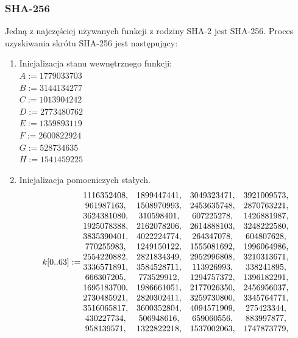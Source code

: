\subsubsection{SHA-256}
Jedną z najczęściej używanych funkcji z rodziny SHA-2 jest SHA-256. Proces uzyskiwania skrótu SHA-256 jest następujący:
\begin{enumerate}
	\item Inicjalizacja stanu wewnętrznego funkcji: \\
		$A := 1779033703$ \\
		$B := 3144134277$ \\
		$C := 1013904242$ \\
		$D := 2773480762$ \\
		$E := 1359893119$ \\
		$F := 2600822924$ \\
		$G := 528734635$ \\
		$H := 1541459225$
	\item Inicjalizacja pomocniczych stałych. \\
			$$
			k[0..63] := \\
			\begin{matrix}
				1116352408, & 1899447441, & 3049323471, & 3921009573, \\
				961987163,  & 1508970993, & 2453635748, & 2870763221, \\
				3624381080, & 310598401,  & 607225278,  & 1426881987, \\
				1925078388, & 2162078206, & 2614888103, & 3248222580, \\
				3835390401, & 4022224774, & 264347078,  & 604807628,  \\
				770255983,  & 1249150122, & 1555081692, & 1996064986, \\
				2554220882, & 2821834349, & 2952996808, & 3210313671, \\
				3336571891, & 3584528711, & 113926993,  & 338241895,  \\
				666307205,  & 773529912,  & 1294757372, & 1396182291, \\
				1695183700, & 1986661051, & 2177026350, & 2456956037, \\
				2730485921, & 2820302411, & 3259730800, & 3345764771, \\
				3516065817, & 3600352804, & 4094571909, & 275423344,  \\
				430227734,  & 506948616,  & 659060556,  & 883997877,  \\
				958139571,  & 1322822218, & 1537002063, & 1747873779, \\

\end{matrix}$$
\end{enumerate}
